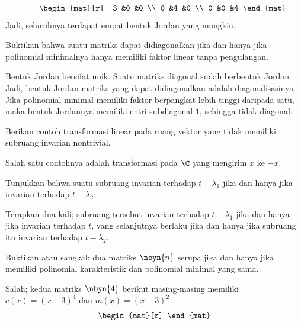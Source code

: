 \begin{exercises}
\begin{answer}
\begin{equation*}
        \qquad
        \begin{mat}[r]
          -3  &0  &0  \\
           0  &4  &0  \\
           0  &0  &4
        \end{mat}
     \end{equation*}  
     Jadi, seluruhnya terdapat empat bentuk Jordan yang mungkin.
    \end{answer}
  \recommended \item
    Buktikan bahwa suatu matriks dapat didiagonalkan jika dan hanya jika
    polinomial minimalnya hanya memiliki faktor linear tanpa pengulangan.
    \begin{answer}
       Bentuk Jordan bersifat unik.
       Suatu matriks diagonal sudah berbentuk Jordan.
       Jadi, bentuk Jordan matriks yang dapat didiagonalkan adalah diagonalisasinya.
       Jika polinomial minimal memiliki faktor berpangkat lebih tinggi daripada satu,
       maka bentuk Jordannya memiliki entri subdiagonal \( 1 \), sehingga tidak
       diagonal.
     \end{answer}
  \item 
    Berikan contoh transformasi linear pada ruang vektor
    yang tidak memiliki subruang invarian nontrivial.
    \begin{answer}
      Salah satu contohnya adalah transformasi pada \( \C \) yang
       mengirim \( x \) ke \( -x \).
     \end{answer}
  \item 
    Tunjukkan bahwa suatu subruang invarian terhadap \( t-\lambda_1 \)
    jika dan hanya jika invarian terhadap \( t-\lambda_2 \).
    \begin{answer}
      Terapkan  dua kali;
      subruang tersebut invarian terhadap $t-\lambda_1$ jika dan hanya jika
      invarian terhadap $t$, yang selanjutnya berlaku jika dan hanya jika
      subruang itu invarian terhadap $t-\lambda_2$.
    \end{answer}
  \item 
     Buktikan atau sangkal: dua matriks \( \nbyn{n} \)
     serupa jika dan hanya jika memiliki polinomial karakteristik dan
     polinomial minimal yang sama.
     \begin{answer}
       Salah; kedua matriks $\nbyn{4}$ berikut masing-masing memiliki $c(x)=(x-3)^4$
       dan $m(x)=(x-3)^2$.
       \begin{equation*}
          \begin{mat}[r]

\end{mat}
\end{equation*}
\end{answer}
\end{exercises}
